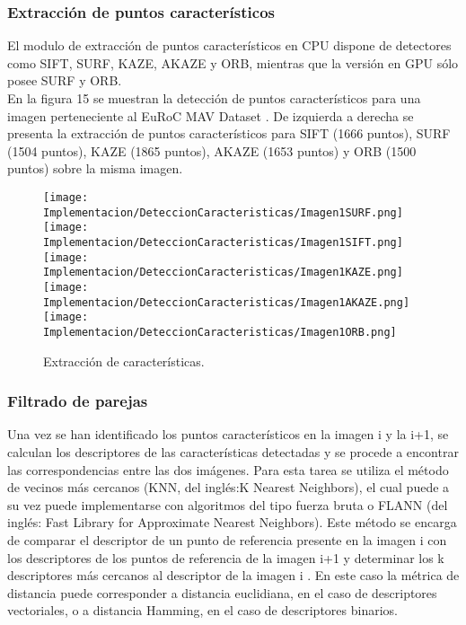 \subsubsection{Extracción de puntos característicos}

El modulo de extracción de puntos característicos en CPU dispone de detectores como SIFT, SURF, KAZE, AKAZE y ORB, mientras que la versión en GPU sólo posee SURF y ORB.\\

En la figura 15 se muestran la detección de puntos característicos  para una imagen perteneciente al EuRoC MAV Dataset \cite{0}. De izquierda a derecha se presenta la extracción de  puntos característicos para SIFT (1666 puntos), SURF (1504 puntos), KAZE (1865 puntos), AKAZE (1653 puntos) y ORB (1500 puntos) sobre la misma imagen. \\
\begin{figure}[H]
	
	\texttt{[image: Implementacion/DeteccionCaracteristicas/Imagen1SURF.png]}
	\texttt{[image: Implementacion/DeteccionCaracteristicas/Imagen1SIFT.png]}
	\texttt{[image: Implementacion/DeteccionCaracteristicas/Imagen1KAZE.png]}
	\texttt{[image: Implementacion/DeteccionCaracteristicas/Imagen1AKAZE.png]}
	\texttt{[image: Implementacion/DeteccionCaracteristicas/Imagen1ORB.png]}
	\caption{Extracción de características.}
	\label{fig:my_label}
\end{figure}


\subsubsection{Filtrado de parejas}


Una vez se han identificado los puntos característicos en la imagen i y la i+1, se calculan los descriptores de las características detectadas y se procede a encontrar las correspondencias entre las dos imágenes. Para esta tarea se utiliza el método de vecinos más cercanos (KNN, del inglés:K Nearest Neighbors), el cual puede a su vez puede implementarse con algoritmos del tipo fuerza bruta o FLANN (del inglés: Fast Library for Approximate Nearest Neighbors). Este método se encarga de comparar el descriptor de un punto de referencia presente en la imagen i con los descriptores de los puntos de referencia de la imagen i+1 y determinar los k descriptores más cercanos al descriptor de la imagen i . En este caso la métrica de distancia puede corresponder a distancia euclidiana, en el caso de descriptores vectoriales, o a distancia Hamming, en el caso de descriptores binarios.\\


